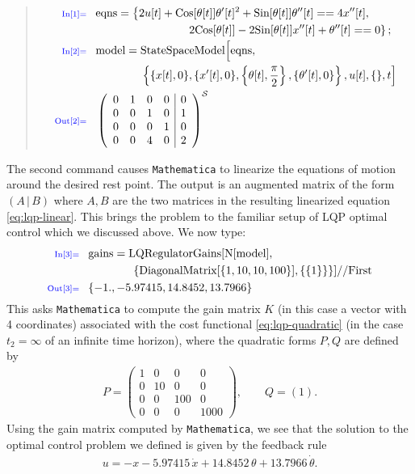 \documentclass[12pt]{amsart}
\newcommand{\eqst}[1]{\begin{align*}#1\end{align*}}
\begin{document}
\vspace{-10.0pt}
\begin{quote}
\eqst{
\scriptsize{\textcolor{blue}{\text{In[1]=}}}\quad & \text{eqns}=\left\{2 u[t]+\text{Cos}[\theta [t]] \theta '[t]^2+\text{Sin}[\theta [t]] \theta ''[t]==4 x''[t], \right.\\ & \qquad\qquad \qquad  \qquad \left. 2 \text{Cos}[\theta [t]]-2 \text{Sin}[\theta [t]] x''[t]+\theta ''[t]==0\right\};
\\
\scriptsize{\textcolor{blue}{\text{In[2]=}}}\quad &\text{model}=\text{StateSpaceModel}\Big[\text{eqns}, \\ & \qquad\qquad \left\{\{x[t],0\},\{x'[t],0\},\left\{\theta [t],\frac{\pi }{2}\right\},\{\theta '[t],0\}\right\},u[t],\{\},t\Big]
\\
\scriptsize{\textcolor{blue}{\text{Out[2]=}}}\quad &
\left(
\begin{array}{cccc|c}
 0 & 1 & 0 & 0 & 0 \\
 0 & 0 & 1 & 0 & 1 \\
 0 & 0 & 0 & 1 & 0 \\
 0 & 0 & 4 & 0 & 2 \\
\end{array}
\right)_{}^{\mathcal{S}}
}
\end{quote}
The second command causes \texttt{Mathematica} to linearize the equations of motion around the desired rest point. The output is an augmented matrix of the form $\left( A\,|\,B\right)$ where $A, B$ are the two matrices in the resulting linearized equation \eqref{eq:lqp-linear}. This brings the problem to the familiar setup of LQP optimal control which we discussed above. We now type:
\eqst{
\scriptsize{\textcolor{blue}{\text{In[3]=}}}\quad &
\text{gains}=\text{LQRegulatorGains}[\text{N}[\text{model}],
\\ & \qquad\qquad
\{\text{DiagonalMatrix}[\{1,10,10,100\}],\{\{1\}\}\}]\text{//}\text{First}
\\
\scriptsize{\textcolor{blue}{\text{Out[3]=}}}\quad &
\{-1.,-5.97415,14.8452,13.7966\}
}
This asks \texttt{Mathematica} to compute the gain matrix $K$ (in this case a vector with 4 coordinates) associated with the cost functional 
\eqref{eq:lqp-quadratic} (in the case $t_2=\infty$ of an infinite time horizon), where the quadratic forms $P, Q$ are defined by
\eqst{
P = \left(\begin{array}{cccc}
1&0&0&0\\0&10&0&0\\0&0&100&0\\0&0&0&1000
\end{array}\right),
\qquad
Q = (1).
}
Using the gain matrix computed by \texttt{Mathematica}, we see that the solution to the optimal control problem we defined is given by the feedback rule
\eqst{
u = - x -5.97415\, \dot{x} + 14.8452\, \theta + 13.7966\, \dot{\theta}.
}
\end{document}
